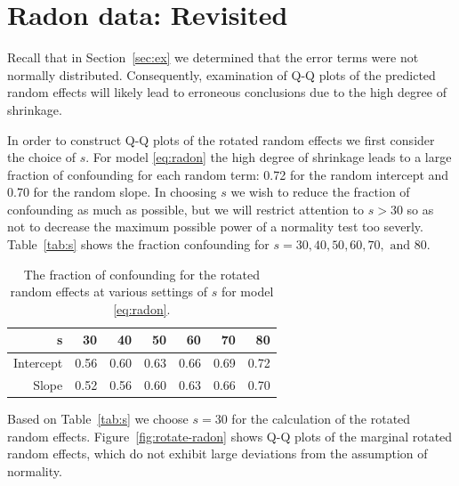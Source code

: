\documentclass[12pt]{article} %
\newcommand{\al}[1]{{\color{red} #1}}
\begin{document}
\section{Radon data: Revisited}\label{sec:radon2}
Recall that in Section~\ref{sec:ex} we determined that the error terms were not normally distributed. Consequently, examination of Q-Q plots of the predicted random effects will likely lead to erroneous conclusions due to the high degree of shrinkage. 

In order to construct Q-Q plots of the rotated random effects we first consider the choice of $s$. For model \eqref{eq:radon} the high degree of shrinkage leads to a large fraction of confounding for each random term: 0.72 for the random intercept and 0.70 for the random slope. In choosing $s$ we wish to reduce the fraction of confounding \al{as much as possible}, but we will restrict attention to $s > 30$ so as not to decrease the maximum possible power of a normality test too severly. Table~\eqref{tab:s} shows the fraction confounding for $s = 30, 40, 50, 60, 70, \text{ and } 80$. 
%
\begin{table}[ht]
\centering
\caption{\label{tab:s} The fraction of confounding for the rotated random effects at various settings of $s$ for model \eqref{eq:radon}.}
\begin{tabular}{rrrrrrr}
  \hline
  s         & 30 & 40 & 50 & 60 & 70 & 80 \\ \hline
  Intercept & 0.56 & 0.60 & 0.63 & 0.66 & 0.69 & 0.72 \\ 
  Slope     & 0.52 & 0.56 & 0.60 & 0.63 & 0.66 & 0.70 \\ 
   \hline
\end{tabular}
\end{table}
%
Based on  Table~\eqref{tab:s} we choose $s=30$ for the calculation of the rotated random effects. Figure~\ref{fig:rotate-radon} shows Q-Q plots of the marginal rotated random effects, which do not exhibit large deviations from the assumption of normality.
\end{document}
